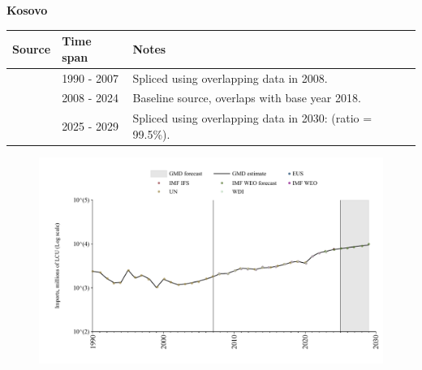 \documentclass[12pt,a4paper,landscape]{article}
\begin{document}
\begin{adjustbox}{max totalsize={\paperwidth}{\paperheight},center}
\begin{minipage}[t][\textheight][t]{\textwidth}
\vspace*{0.5cm}
{}
\begin{center}
{\Large\bfseries Kosovo}
\end{center}
\vspace{0.5cm}
\begin{table}[H]
\centering
\small
\begin{tabular}{|l|l|l|}
\hline
\textbf{Source} & \textbf{Time span} & \textbf{Notes} \\
\hline
\rowcolor{white}\cite{UN}& 1990 - 2007 &Spliced using overlapping data in 2008.\\
\rowcolor{lightgray}\cite{EUS}& 2008 - 2024 &Baseline source, overlaps with base year 2018.\\
\rowcolor{white}\cite{IMF_WEO_forecast}& 2025 - 2029 &Spliced using overlapping data in 2030: (ratio = 99.5\%).\\
\hline
\end{tabular}
\end{table}
\begin{figure}[H]
\centering
\includegraphics[width=\textwidth,height=0.6\textheight,keepaspectratio]{graphs/XKX_imports.pdf}
\end{figure}
\end{minipage}
\end{adjustbox}
\end{document}
